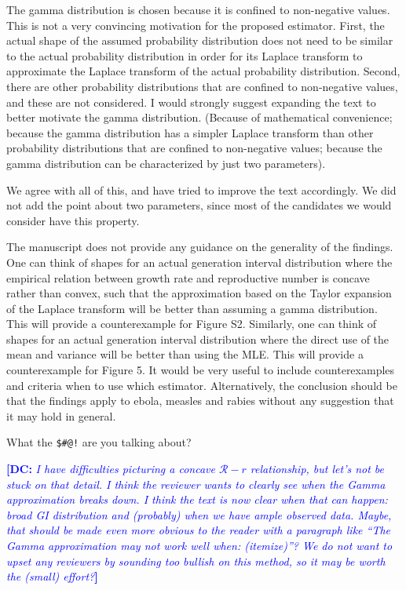 \documentclass[12pt]{article}
\newcommand{\revtext}{\textsf}
\newcommand{\comment}[3]{\textcolor{#1}{\textbf{[#2: }\textsl{#3}\textbf{]}}}
\newcommand{\dc}[1]{\comment{blue}{DC}{#1}}
\begin{document}
\revtext{The gamma distribution is chosen because it is confined to non-negative values. This is not a very convincing motivation for the proposed estimator. First, the actual shape of the assumed probability distribution does not need to be similar to the actual probability distribution in order for its Laplace transform to approximate the Laplace transform of the actual probability distribution. Second, there are other probability distributions that are confined to non-negative values, and these are not considered. I would strongly suggest expanding the text to better motivate the gamma distribution. (Because of mathematical convenience; because the gamma distribution has a simpler Laplace transform than other probability distributions that are confined to non-negative values; because the gamma distribution can be characterized by just two parameters).}

We agree with all of this, and have tried to improve the text accordingly. We did not add the point about two parameters, since most of the candidates we would consider have this property.

\revtext{The manuscript does not provide any guidance on the generality of the findings. One can think of shapes for an actual generation interval distribution where the empirical relation between growth rate and reproductive number is concave rather than convex, such that the approximation based on the Taylor expansion of the Laplace transform will be better than assuming a gamma distribution. This will provide a counterexample for Figure S2. Similarly, one can think of shapes for an actual generation interval distribution where the direct use of the mean and variance will be better than using the MLE. This will provide a counterexample for Figure 5. It would be very useful to include counterexamples and criteria when to use which estimator. Alternatively, the conclusion should be that the findings apply to ebola, measles and rabies without any suggestion that it may hold in general.}

What the \verb|$#@!| are you talking about?

\dc{I have difficulties picturing a concave $\mathcal{R}-r$ relationship, but let's not be stuck on that detail. I think the reviewer wants to \emph{clearly} see when the Gamma approximation breaks down. I think the text is now clear when that can happen: broad GI distribution and (probably) when we have ample observed data. 
Maybe, that should be made even more obvious to the reader with a paragraph like ``The Gamma approximation may not work well when: (itemize)''? 
We do not want to upset any reviewers by sounding too bullish on this method, so it may be worth the (small) effort?}
\end{document}

